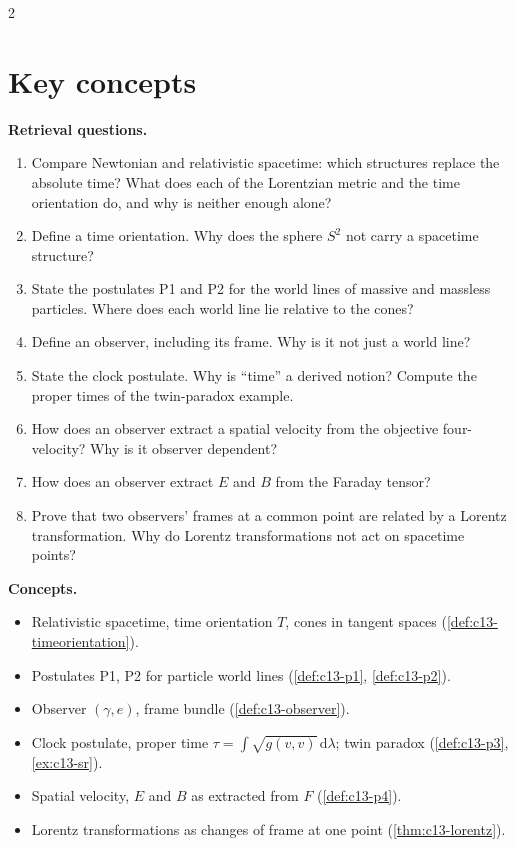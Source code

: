 \begin{paracol}{2}
\section*{Key concepts}
\begin{keyconcepts}
\textbf{Retrieval questions.}
\begin{enumerate}
  \item Compare Newtonian and relativistic spacetime: which structures replace the absolute time? What does each of the Lorentzian metric and the time orientation do, and why is neither enough alone?
  \item Define a time orientation. Why does the sphere $S^2$ not carry a spacetime structure?
  \item State the postulates P1 and P2 for the world lines of massive and massless particles. Where does each world line lie relative to the cones?
  \item Define an observer, including its frame. Why is it not just a world line?
  \item State the clock postulate. Why is ``time'' a derived notion? Compute the proper times of the twin-paradox example.
  \item How does an observer extract a spatial velocity from the objective four-velocity? Why is it observer dependent?
  \item How does an observer extract $E$ and $B$ from the Faraday tensor?
  \item Prove that two observers' frames at a common point are related by a Lorentz transformation. Why do Lorentz transformations not act on spacetime points?
\end{enumerate}
\textbf{Concepts.}
\begin{itemize}
  \item Relativistic spacetime, time orientation $T$, cones in tangent spaces (\cref{def:c13-timeorientation}).
  \item Postulates P1, P2 for particle world lines (\cref{def:c13-p1}, \cref{def:c13-p2}).
  \item Observer $(\gamma,e)$, frame bundle (\cref{def:c13-observer}).
  \item Clock postulate, proper time $\tau=\int\sqrt{g(v,v)}\,\mathrm d\lambda$; twin paradox (\cref{def:c13-p3}, \cref{ex:c13-sr}).
  \item Spatial velocity, $E$ and $B$ as extracted from $F$ (\cref{def:c13-p4}).
  \item Lorentz transformations as changes of frame at one point (\cref{thm:c13-lorentz}).
\end{itemize}
\end{keyconcepts}

\flushside
\end{paracol}
